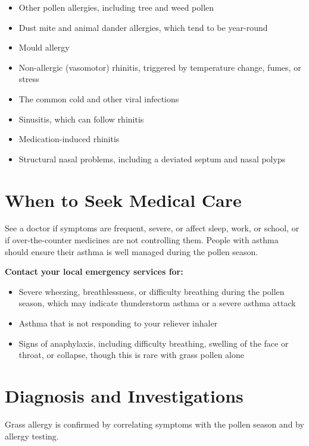 \begin{itemize}
    \item Other pollen allergies, including tree and weed pollen
    \item Dust mite and animal dander allergies, which tend to be year-round
    \item Mould allergy
    \item Non-allergic (vasomotor) rhinitis, triggered by temperature change, fumes, or stress
    \item The common cold and other viral infections
    \item Sinusitis, which can follow rhinitis
    \item Medication-induced rhinitis
    \item Structural nasal problems, including a deviated septum and nasal polyps
\end{itemize}

\section*{When to Seek Medical Care}
See a doctor if symptoms are frequent, severe, or affect sleep, work, or school, or if over-the-counter medicines are not controlling them. People with asthma should ensure their asthma is well managed during the pollen season.

\textbf{Contact your local emergency services for:}
\begin{itemize}
    \item Severe wheezing, breathlessness, or difficulty breathing during the pollen season, which may indicate thunderstorm asthma or a severe asthma attack
    \item Asthma that is not responding to your reliever inhaler
    \item Signs of anaphylaxis, including difficulty breathing, swelling of the face or throat, or collapse, though this is rare with grass pollen alone
\end{itemize}

\section*{Diagnosis and Investigations}
Grass allergy is confirmed by correlating symptoms with the pollen season and by allergy testing.

